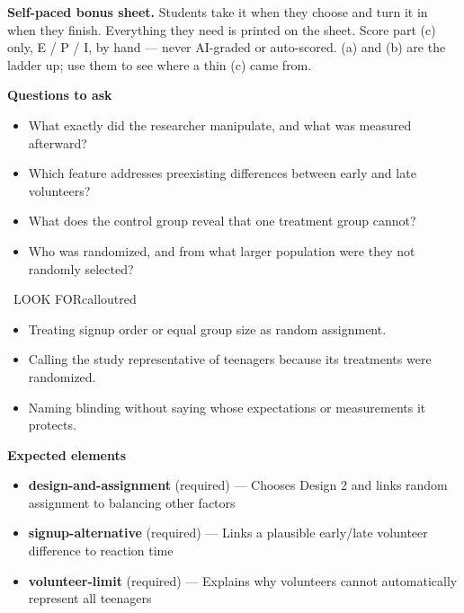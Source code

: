 \documentclass[11pt]{article}
\begin{document}
\textbf{Self-paced bonus sheet.} Students take it when they choose and turn it in when they finish. Everything they need is printed on the sheet. Score part (c) only, E / P / I, by hand --- never AI-graded or auto-scored. (a) and (b) are the ladder up; use them to see where a thin (c) came from.\par

\textbf{Questions to ask}
\begin{itemize}[leftmargin=1.5em,itemsep=2pt,topsep=2pt]
  \item What exactly did the researcher manipulate, and what was measured afterward?
  \item Which feature addresses preexisting differences between early and late volunteers?
  \item What does the control group reveal that one treatment group cannot?
  \item Who was randomized, and from what larger population were they not randomly selected?
\end{itemize}

\begin{callout}{\IconWarn\ LOOK FOR}{calloutred}
\begin{itemize}[leftmargin=1.5em,itemsep=2pt,topsep=2pt]
  \item Treating signup order or equal group size as random assignment.
  \item Calling the study representative of teenagers because its treatments were randomized.
  \item Naming blinding without saying whose expectations or measurements it protects.
\end{itemize}
\end{callout}


\textbf{Expected elements}
\begin{itemize}[leftmargin=1.5em,itemsep=2pt,topsep=2pt]
  \item \textbf{design-and-assignment} (required) --- Chooses Design 2 and links random assignment to balancing other factors
  \item \textbf{signup-alternative} (required) --- Links a plausible early/late volunteer difference to reaction time
  \item \textbf{volunteer-limit} (required) --- Explains why volunteers cannot automatically represent all teenagers
\end{itemize}
\end{document}
